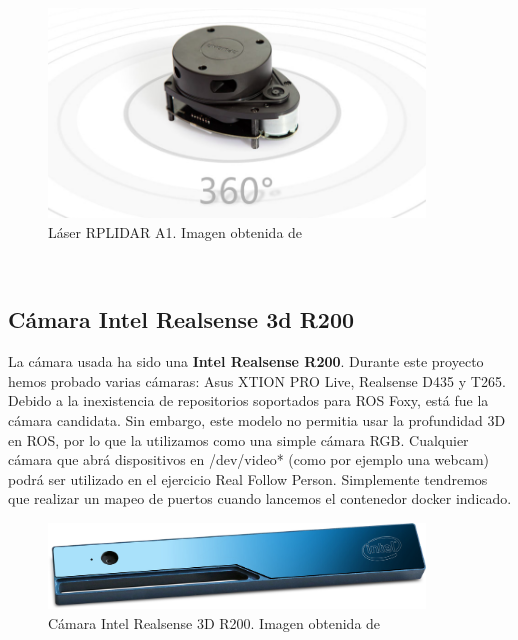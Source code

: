\begin{figure} [H]
  \begin{center}
    \includegraphics[width=10cm]{imagenes/rplidar-a1.png}
  \end{center}
  \caption[Láser RPLIDAR A1]{Láser RPLIDAR A1. Imagen obtenida de \cite{rplidar_a1}}
  \label{fig:rplidar_a1}
\end{figure}\

\subsection{Cámara Intel Realsense 3d R200}
\label{subsec:intel_realsense_3d}

La cámara usada ha sido una \textbf{Intel Realsense R200}. Durante este proyecto hemos probado varias cámaras: Asus XTION PRO Live, Realsense D435 y T265. Debido a la inexistencia de repositorios soportados para ROS Foxy, está fue la cámara candidata. Sin embargo, este modelo no permitia usar la profundidad 3D en ROS, por lo que la utilizamos como una simple cámara RGB. Cualquier cámara que abrá dispositivos en /dev/video* (como por ejemplo una webcam) podrá ser utilizado en el ejercicio Real Follow Person. Simplemente tendremos que realizar un mapeo de puertos cuando lancemos el contenedor docker indicado.\\

\begin{figure} [H]
  \begin{center}
    \includegraphics[width=10cm]{imagenes/r200.jpg}
  \end{center}
  \caption[Cámara Intel Realsense 3D R200]{Cámara Intel Realsense 3D R200. Imagen obtenida de \cite{R200}}
  \label{fig:camara_r200}
\end{figure}\


